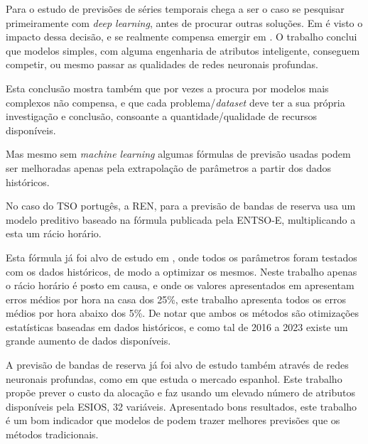 Para o estudo de previsões de séries temporais chega a ser o caso se pesquisar primeiramente com \textit{deep learning}, antes de procurar outras soluções. Em \cite{Elsayed} é visto o impacto dessa decisão, e se realmente compensa emergir em . O trabalho conclui que modelos simples, com alguma engenharia de atributos inteligente, conseguem competir, ou mesmo passar as qualidades de redes neuronais profundas.\par
Esta conclusão mostra também que por vezes a procura por modelos mais complexos não compensa, e que cada problema/\textit{dataset} deve ter a sua própria investigação e conclusão, consoante a quantidade/qualidade de recursos disponíveis.\par
Mas mesmo sem \textit{machine learning} algumas fórmulas de previsão usadas podem ser melhoradas apenas pela extrapolação de parâmetros a partir dos dados históricos.\par  
No caso do \gls{TSO} portugês, a \gls{REN}, para a previsão de bandas de reserva usa um modelo preditivo baseado na fórmula publicada pela \gls{ENTSO-E}, multiplicando a esta um rácio horário.\par
Esta fórmula já foi alvo de estudo em \cite{Carneiro2016}, onde todos os parâmetros foram testados com os dados históricos, de modo a optimizar os mesmos. Neste trabalho apenas o rácio horário é posto em causa, e onde os valores apresentados em \cite{Carneiro2016} apresentam erros médios por hora na casa dos 25\%, este trabalho apresenta todos os erros médios por hora abaixo dos 5\%. De notar que ambos os métodos são otimizações estatísticas baseadas em dados históricos, e como tal de 2016 a 2023 existe um grande aumento de dados disponíveis.\par
A previsão de bandas de reserva já foi alvo de estudo também através de redes neuronais profundas, como em \cite{miota2023} que estuda o mercado espanhol. Este trabalho propõe prever o custo da alocação e faz usando um elevado número de atributos disponíveis pela \gls{ESIOS}, 32 variáveis. Apresentado bons resultados, este trabalho é um bom indicador que modelos de  podem trazer melhores previsões que os métodos tradicionais.\par


